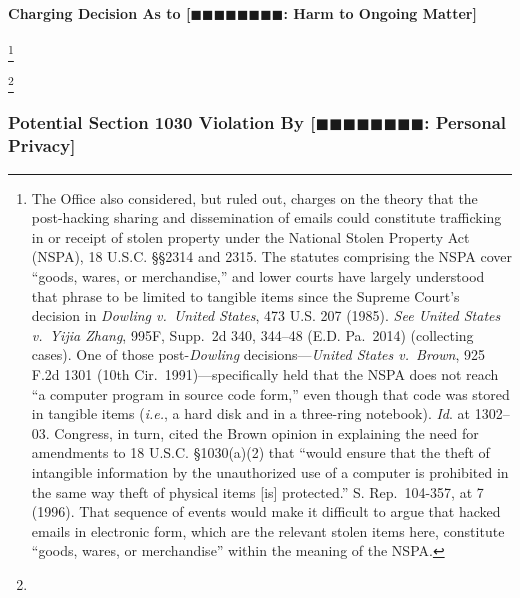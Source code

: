 \paragraph{Charging Decision As to [$\blacksquare\blacksquare\blacksquare\blacksquare\blacksquare\blacksquare\blacksquare\blacksquare$: Harm to Ongoing Matter]}
\footnote{The Office also considered, but ruled out, charges on the theory that the post-hacking sharing and dissemination of emails could constitute trafficking in or receipt of stolen property under the National Stolen Property Act (NSPA), 18 U.S.C. \S\S 2314 and 2315.
The statutes comprising the NSPA cover “goods, wares, or merchandise,” and lower courts have largely understood that phrase to be limited to tangible items since the Supreme Court's decision in \textit{Dowling v.\ United States}, 473 U.S. 207 (1985).
\textit{See United States v.\ Yijia Zhang}, 995F, Supp.~2d 340, 344--48 (E.D. Pa.~2014) (collecting cases).
One of those post-\textit{Dowling} decisions---\textit{United States v.\ Brown}, 925 F.2d 1301 (10th Cir.~1991)---specifically held that the NSPA does not reach “a computer program in source code form,” even though that code was stored in tangible items (\textit{i.e.}, a hard disk and in a three-ring notebook).
\textit{Id}. at 1302--03.
Congress, in turn, cited the Brown opinion in explaining the need for amendments to 18 U.S.C. \S 1030(a)(2) that “would ensure that the theft of intangible information by the unauthorized use of a computer is prohibited in the same way theft of physical items [is] protected.”
S. Rep.~104-357, at 7 (1996).
That sequence of events would make it difficult to argue that hacked emails in electronic form, which are the relevant stolen items here, constitute “goods, wares, or merchandise” within the meaning of the NSPA.}




\footnote{}






\subsubsection{Potential Section 1030 Violation By [$\blacksquare\blacksquare\blacksquare\blacksquare\blacksquare\blacksquare\blacksquare\blacksquare$: Personal Privacy]}

